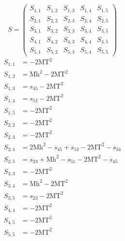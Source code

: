 \documentclass[a4paper]{article}
\begin{document}
\begin{equation}
S=\left(\begin{array}{ccccc}
   S_{1,1}&
   S_{1,2}&
   S_{1,3}&
   S_{1,4}&
   S_{1,5}\\
   S_{2,1}&
   S_{2,2}&
   S_{2,3}&
   S_{2,4}&
   S_{2,5}\\
   S_{3,1}&
   S_{3,2}&
   S_{3,3}&
   S_{3,4}&
   S_{3,5}\\
   S_{4,1}&
   S_{4,2}&
   S_{4,3}&
   S_{4,4}&
   S_{4,5}\\
   S_{5,1}&
   S_{5,2}&
   S_{5,3}&
   S_{5,4}&
   S_{5,5}\end{array}\right)
\end{equation}
\begin{subequations}
\begin{align}
   S_{1,1}&=-2\text{MT}^2\\
   S_{1,2}&=\text{Mh}^2-2\text{MT}^2\\
   S_{1,3}&=s_{45}-2\text{MT}^2\\
   S_{1,4}&=s_{12}-2\text{MT}^2\\
   S_{1,5}&=-2\text{MT}^2\\
   S_{2,2}&=-2\text{MT}^2\\
   S_{2,3}&=-2\text{MT}^2\\
   S_{2,4}&=2\text{Mh}^2-s_{45}+s_{12}-2\text{MT}^2-s_{34}\\
   S_{2,5}&=s_{23}+\text{Mh}^2-s_{51}-2\text{MT}^2-s_{45}\\
   S_{3,3}&=-2\text{MT}^2\\
   S_{3,4}&=\text{Mh}^2-2\text{MT}^2\\
   S_{3,5}&=s_{23}-2\text{MT}^2\\
   S_{4,4}&=-2\text{MT}^2\\
   S_{4,5}&=-2\text{MT}^2\\
   S_{5,5}&=-2\text{MT}^2
\end{align}
\end{subequations}
\end{document}
